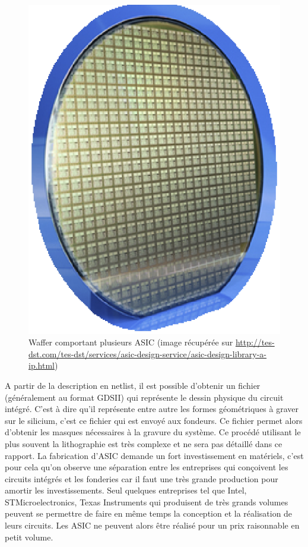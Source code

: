 \begin{figure}[hb]
\begin{center}
\includegraphics[scale=0.4]{asic.eps}
\end{center}
\caption{Waffer comportant plusieurs ASIC (image récupérée sur \url{http://tes-dst.com/tes-dst/services/asic-design-service/asic-design-library-a-ip.html})}
\end{figure}

A partir de la description en netlist, il est possible d'obtenir un fichier
(généralement au format GDSII) qui représente le dessin physique du circuit intégré.
C'est à dire qu'il représente entre autre les formes géométriques à graver sur le
silicium, c'est ce fichier qui est envoyé aux fondeurs. Ce fichier permet alors
d'obtenir les masques nécessaires à la gravure du système. Ce procédé utilisant le
plus souvent la lithographie est très complexe et ne sera pas détaillé dans ce
rapport. La fabrication d'ASIC demande un fort investissement en matériels, c'est
pour cela qu'on observe une séparation entre les entreprises qui conçoivent les
circuits intégrés et les fonderies car il faut une très grande production pour
amortir les investissements. Seul quelques entreprises tel que Intel,
STMicroelectronics, Texas Instruments qui produisent de très grands volumes peuvent
se permettre de faire en même temps la conception et la réalisation de leurs
circuits. Les ASIC ne peuvent alors être réalisé pour un prix raisonnable en petit
volume.


